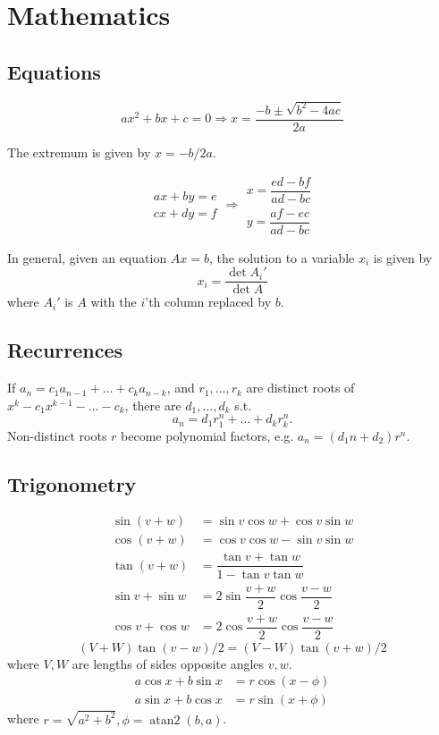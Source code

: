 
\chapter{Mathematics}

\section{Equations}
\[ax^2+bx+c=0 \Rightarrow x = \frac{-b\pm\sqrt{b^2-4ac}}{2a}\]

The extremum is given by $x = -b/2a$.

\[\begin{aligned}ax+by=e\\cx+dy=f\end{aligned}
\Rightarrow
\begin{aligned}x=\dfrac{ed-bf}{ad-bc}\\y=\dfrac{af-ec}{ad-bc}\end{aligned}\]

In general, given an equation $Ax = b$, the solution to a variable $x_i$ is given by
\[x_i = \frac{\det A_i'}{\det A} \]
where $A_i'$ is $A$ with the $i$'th column replaced by $b$.

\section{Recurrences}
If $a_n = c_1 a_{n-1} + \dots + c_k a_{n-k}$, and $r_1, \dots, r_k$ are distinct roots of $x^k - c_1 x^{k-1} - \dots - c_k$, there are $d_1, \dots, d_k$ s.t.
\[a_n = d_1r_1^n + \dots + d_kr_k^n. \]
Non-distinct roots $r$ become polynomial factors, e.g. $a_n = (d_1n + d_2)r^n$.

\section{Trigonometry}
\begin{align*}
\sin(v+w)&{}=\sin v\cos w+\cos v\sin w\\
\cos(v+w)&{}=\cos v\cos w-\sin v\sin w\\
\tan(v+w)&{}=\dfrac{\tan v+\tan w}{1-\tan v\tan w}\\
\sin v+\sin w&{}=2\sin\dfrac{v+w}{2}\cos\dfrac{v-w}{2}\\
\cos v+\cos w&{}=2\cos\dfrac{v+w}{2}\cos\dfrac{v-w}{2}
\end{align*}
\[ (V+W)\tan(v-w)/2{}=(V-W)\tan(v+w)/2 \]
where $V, W$ are lengths of sides opposite angles $v, w$.
\begin{align*}
	a\cos x+b\sin x&=r\cos(x-\phi)\\
	a\sin x+b\cos x&=r\sin(x+\phi)
\end{align*}
where $r=\sqrt{a^2+b^2}, \phi=\operatorname{atan2}(b,a)$.

